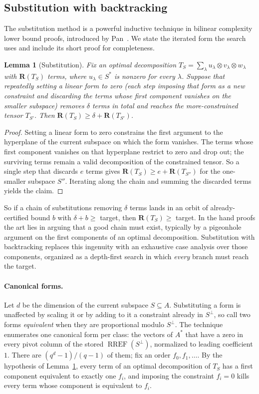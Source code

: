 \documentclass[11pt]{article}
\newtheorem{lemma}{Lemma}
\theoremstyle{definition}
\newcommand{\R}{\mathbf{R}}
\newcommand{\RREF}{\operatorname{RREF}}
\begin{document}
\subsection{Substitution with backtracking}\label{sec:backtracking}

The substitution method is a powerful inductive technique in bilinear complexity
lower bound proofs, introduced by Pan~\cite{pan1966methods}.
We state the iterated form the search uses and include
its short proof for completeness.

\begin{lemma}[Substitution]\label{lem:substitution}
  Fix an optimal decomposition $T_S=\sum_{\lambda}u_\lambda\otimes v_\lambda\otimes
  w_\lambda$ with $\R(T_S)$ terms, where $u_\lambda\in S^*$ is nonzero for every
  $\lambda$. Suppose that repeatedly setting a linear form to zero
  (each step imposing that form as a new constraint and discarding the terms whose
  first component vanishes on the smaller subspace) removes $\delta$ terms in total and
  reaches the more-constrained tensor $T_{S'}$. Then $\R(T_S)\ge\delta+\R(T_{S'})$.
\end{lemma}

\begin{proof}
  Setting a linear form to zero constrains the first argument to the hyperplane of the
  current subspace on which the form vanishes. The terms whose first component vanishes
  on that hyperplane restrict to zero and drop out; the
  surviving terms remain a valid decomposition of the constrained tensor. So a single
  step that discards $e$ terms gives $\R(T_S)\ge e+\R(T_{S''})$ for the one-smaller
  subspace $S''$. Iterating along the chain and summing the discarded terms yields the
  claim.
\end{proof}

So if a chain of substitutions removing $\delta$ terms lands in an orbit of
already-certified bound $b$ with $\delta+b\ge$ target, then $\R(T_S)\ge$ target. In
the hand proofs the art lies in arguing that a good chain must exist, typically by
a pigeonhole argument on the first components of an optimal decomposition.
Substitution with backtracking replaces this ingenuity with an exhaustive case analysis
over those components, organized as a depth-first search in which \emph{every}
branch must reach the target.

\paragraph{Canonical forms.} Let $d$ be the dimension of the current
subspace $S\subseteq A$. Substituting a form is unaffected by scaling it or by
adding to it a constraint already in $S^{\perp}$, so call two forms \emph{equivalent} when
they are proportional modulo $S^{\perp}$. The technique enumerates one canonical form
per class: the vectors of $A^*$ that have a zero in every pivot column of the
stored $\RREF(S^\perp)$, normalized to leading coefficient $1$. There are $(q^d-1)/(q-1)$ of
them; fix an order $f_0,f_1,\dots$. By the hypothesis of
Lemma~\ref{lem:substitution}, every term of an optimal decomposition of $T_S$ has
a first component equivalent to exactly one $f_i$, and imposing the constraint
$f_i=0$ kills every term whose component is equivalent to $f_i$.
\end{document}
